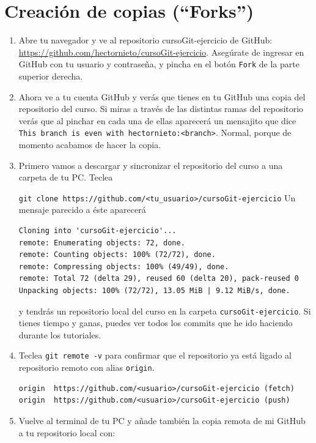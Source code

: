 \documentclass[a4paper,11pt]{report}
\newcommand{\cverb}{\Verb}
\begin{document}
   \section{Creación de copias (``Forks'')}
		  \begin{enumerate}
			  \item Abre tu navegador y ve al repositorio cursoGit-ejercicio de GitHub: \url{https://github.com/hectornieto/cursoGit-ejercicio}. Asegúrate de ingresar en GitHub con tu usuario y contraseña, y pincha en el botón \cverb+Fork+ de la parte superior derecha.

		   \item Ahora ve a tu cuenta GitHub y verás que tienes en tu GitHub una copia del repositorio del curso. Si miras a través de las distintas ramas del repositorio verás que al pinchar en cada una de ellas aparecerá un mensajito que dice \verb+This branch is even with hectornieto:<branch>+. Normal, porque de momento acabamos de hacer la copia.

		   \item Primero vamos a descargar y sincronizar el repositorio del curso a una carpeta de tu PC. Teclea
   
		   \cverb+git clone https://github.com/<tu_usuario>/cursoGit-ejercicio+
		   Un mensaje parecido a éste aparecerá
   
		   \begin{lstlisting}[style=custom]
Cloning into 'cursoGit-ejercicio'...
remote: Enumerating objects: 72, done.
remote: Counting objects: 100% (72/72), done.
remote: Compressing objects: 100% (49/49), done.
remote: Total 72 (delta 29), reused 60 (delta 20), pack-reused 0
Unpacking objects: 100% (72/72), 13.05 MiB | 9.12 MiB/s, done.
   \end{lstlisting}
		   y tendrás un repositorio local del curso en la carpeta \cverb+cursoGit-ejercicio+. Si tienes tiempo y ganas, puedes ver todos los commits que he ido haciendo durante los tutoriales.
   
		   \item Teclea \cverb+git remote -v+ para confirmar que el repositorio ya está ligado al repositorio remoto con alias \verb+origin+.
   
   \begin{lstlisting}[style=custom]
origin	https://github.com/<usuario>/cursoGit-ejercicio (fetch)
origin	https://github.com/<usuario>/cursoGit-ejercicio (push)
   \end{lstlisting}

   
   \item Vuelve al terminal de tu PC y añade también la copia remota de mi GitHub a tu repositorio local con:
   

\end{enumerate}
\end{document}
